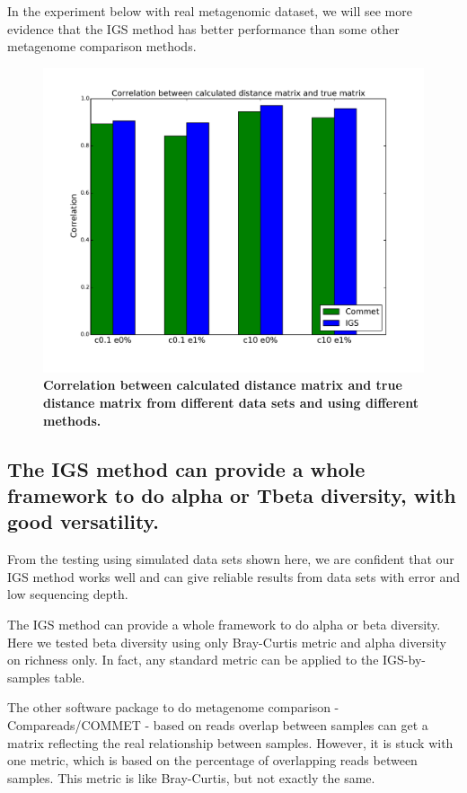 \documentclass{article}
\begin{document}
In the experiment below with real metagenomic dataset, we will see more evidence
that the IGS method has better performance than some other metagenome comparison methods.

\begin{figure}[!ht]
 \centerline{\includegraphics[width=6in]{./figures/compare_commet.pdf}}
\caption{\bf Correlation between calculated distance matrix and true distance matrix
from different data sets and using different methods.}
\label{fig:compare_commet}
\end{figure}

\subsection{The IGS method can provide a whole framework to do alpha or 
Tbeta diversity, with good versatility.}

From the testing using simulated data sets shown here, we are confident that 
our IGS method works well and can give reliable results from data sets with 
error and low sequencing depth.

The IGS method can provide a whole framework to do alpha or beta diversity. 
Here we tested beta diversity using only Bray-Curtis metric and alpha 
diversity on richness only. In fact, any standard metric can be applied to the 
IGS-by-samples table.

The other software package to do metagenome comparison - Compareads/COMMET -
based on reads overlap between samples can get a matrix 
reflecting the real relationship between samples. However, it is stuck with one 
metric, which is based on the percentage of overlapping reads between samples. 
This metric is like Bray-Curtis, but not exactly the same.
\end{document}
